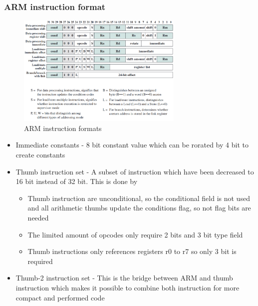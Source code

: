 \documentclass[12pt, a4paper]{article}
\begin{document}
			\subsubsection{ARM instruction format}
				\begin{figure}[h!]
					\includegraphics[width=300px]{assets/ARMInstructionFormat.png}
					\centering
					\caption{ARM instruction formats}
				\end{figure}
				\begin{itemize}
					\item Immediate constants - 8 bit constant value which can be rorated by 4 bit to create constants
					\item Thumb instruction set - A subset of instruction which have been decreased to 16 bit instead of 32 bit. This is done by
						\begin{itemize}
							\item Thumb instruction are unconditional, so the conditional field is not used and all arithmetic thumbs update the conditions flag, so not flag bits are needed
							\item The limited amount of opcodes only require 2 bits and 3 bit type field
							\item Thumb instructions only references registers r0 to r7 so only 3 bit is required
						\end{itemize}
					\item Thumb-2 instruction set - This is the bridge between ARM and thumb instruction which makes it possible to combine both instruction for more compact and performed code
				\end{itemize}
\end{document}
